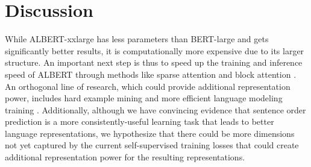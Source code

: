 \section{Discussion}


While ALBERT-xxlarge has less parameters than BERT-large and gets significantly better results, it is computationally more expensive due to its larger structure. An important next step is thus to speed up the training and inference speed of ALBERT through methods like sparse attention \citep{child2019generating} and block attention \citep{shen2018bi}.
An orthogonal line of research, which could provide additional representation power, includes hard example mining \citep{mikolov2013distributed} and more efficient language modeling training \citep{yang2019xlnet}.
Additionally, although we have convincing evidence that sentence order prediction is a more consistently-useful learning task that leads to better language representations, we hypothesize that there could be more dimensions not yet captured by the current self-supervised training losses that could create additional representation power for the resulting representations.

